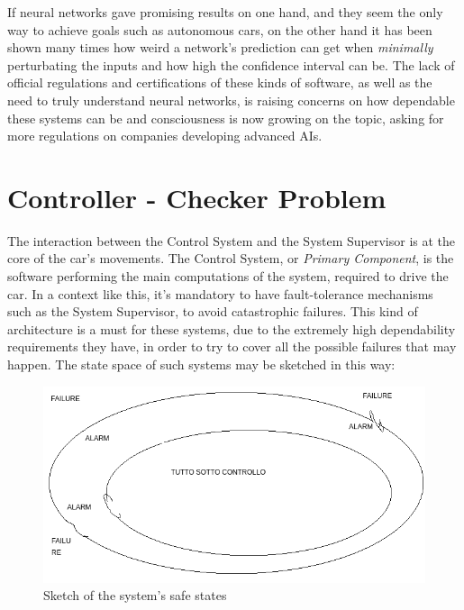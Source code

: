 If neural networks gave promising results on one hand, and they seem the only way to achieve goals such as autonomous cars, on the other hand it has been shown many times how weird a network's prediction can get when \textsl{minimally} perturbating the inputs\cite{stupidnn} and how high the confidence interval can be.\cite{foolnn} The lack of official regulations and certifications of these kinds of software, as well as the need to truly understand neural networks, is raising concerns on how dependable these systems can be and consciousness is now growing on the topic, asking for more regulations on companies developing advanced AIs.\cite{elonmusk}\newline

\section{Controller - Checker Problem}


The interaction between the Control System and the System Supervisor is at the core of the car's movements. The Control System, or \textsl{Primary Component}, is the software performing the main computations of the system, required to drive the car. In a context like this, it's mandatory to have fault-tolerance mechanisms such as the System Supervisor, to avoid catastrophic failures. This kind of architecture is a must for these systems, due to the extremely high dependability requirements they have, in order to try to cover all the possible failures that may happen. The state space of such systems may be sketched in this way:
\newpage

\begin{figure}[h!]
	\includegraphics[width=\textwidth]{img/state-space.png}
	\caption{Sketch of the system's safe states}
\end{figure}

